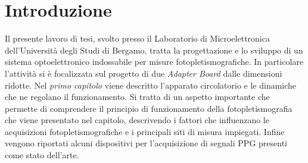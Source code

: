 \documentclass[
	a4paper,
	cleardoublepage=empty,
	headings=twolinechapter,
	numbers=autoenddot,
]{scrbook}
\begin{document}
	\frontmatter
	
	\begin{frontespizio}
		\Margini{3cm}{3cm}{3cm}{3cm}
		\Punteggiatura{}
		\begin{Preambolo*}
			\usepackage[italian]{babel}
			\usepackage[T1]{fontenc}
			\usepackage[utf8]{inputenc}
			\usepackage{microtype}
			\usepackage{lmodern}
			\graphicspath{{img/}}
			
			\renewcommand{\frontinstitutionfont}{\fontsize{14}{17}\bfseries\scshape}
			\renewcommand{\fronttitlefont}{\fontsize{17}{21}\bfseries\scshape}
			\renewcommand{\frontfootfont}{\fontsize{12}{14}\bfseries\scshape}
		\end{Preambolo*}
	\end{frontespizio}
	
	\tableofcontents
	\listoffigures
	\mainmatter
	
	\chapter*{Introduzione}
	Il presente lavoro di tesi, svolto presso il Laboratorio di Microelettronica dell’Università degli Studi di Bergamo, tratta la progettazione e lo sviluppo di un sistema optoelettronico indossabile per misure fotopletismografiche. In particolare l'attività si è focalizzata sul progetto di due \textit{Adapter Board} dalle dimensioni ridotte.
	Nel \textit{primo capitolo} viene descritto l'apparato circolatorio e le dinamiche che ne regolano il funzionamento. Si tratta di un aspetto importante che permette di comprendere il principio di funzionamento della fotopletismografia che viene presentato nel capitolo, descrivendo i fattori che influenzano le acquisizioni fotopletismografiche e i principali siti di misura impiegati. Infine vengono riportati alcuni dispositivi per l'acquisizione di segnali PPG presenti come stato dell'arte.
	
\end{document}
